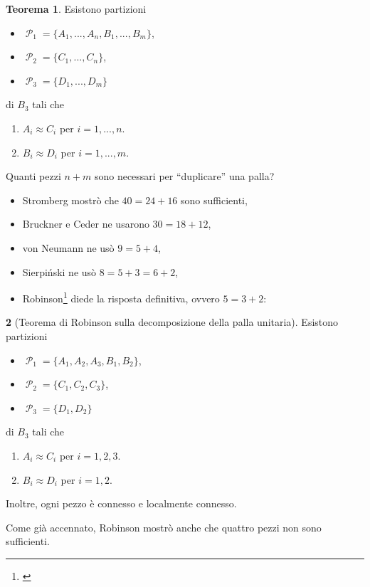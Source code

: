 \documentclass[12pt,a4paper]{report}
\theoremstyle{definition}
\newtheorem{teo}{Teorema}[section]  %
\theoremstyle{num.custom-title}
\newtheorem{teo_custom-title}[teo]{} %
\DeclareMathOperator{\PP}{\mathcal{P}}
\begin{document}
\begin{teo}
Esistono partizioni
\begin{itemize}
\item[] $\PP_1=\{A_1,...,A_n,B_1,...,B_m\}$,
\item[] $\PP_2=\{C_1,...,C_n\}$,
\item[] $\PP_3=\{D_1,...,D_m\}$
\end{itemize}
di $B_3$ tali che 
\begin{enumerate}
\item $A_i \approx C_i$ per $i=1,...,n$.
\item $B_i \approx D_i$ per $i=1,...,m$.
\end{enumerate}
\end{teo}

Quanti pezzi $n+m$ sono necessari per ``duplicare'' una palla?

\begin{itemize}
\item Stromberg mostrò che $40=24+16$ sono sufficienti,
\item Bruckner e Ceder ne usarono $30=18+12$,
\item von Neumann ne usò $9=5+4$,
\item Sierpiński ne usò $8=5+3=6+2$,
\item Robinson\footnote{\cite{Rob47:Herrlich}} diede la risposta definitiva, ovvero $5=3+2$:
\end{itemize}

\begin{teo_custom-title}[Teorema di Robinson sulla decomposizione della palla unitaria]
Esistono partizioni
\begin{itemize}
\item[] $\PP_1=\{A_1,A_2,A_3,B_1,B_2\}$,
\item[] $\PP_2=\{C_1,C_2,C_3\}$,
\item[] $\PP_3=\{D_1,D_2\}$
\end{itemize}
di $B_3$ tali che 
\begin{enumerate}
\item $A_i \approx C_i$ per $i=1,2,3$.
\item $B_i \approx D_i$ per $i=1,2$.
\end{enumerate}
Inoltre, ogni pezzo è connesso e localmente connesso.
\end{teo_custom-title}

Come già accennato, Robinson mostrò anche che quattro pezzi non sono sufficienti.\\
\end{document}
